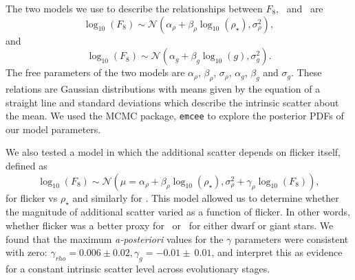 The two models we use to describe the relationships between $F_8$, \logg\ and
\rhostar\ are
\begin{equation}
	\log_{10}(F_8) \sim \mathcal{N} \left(\alpha_\rho +
    \beta_\rho \log_{10}(\rho_\star), \sigma_\rho^2 \right),
\end{equation}
\label{eq:rho}
and
\begin{equation}
	\log_{10}(F_8) \sim \mathcal{N} \left(\alpha_g + \beta_g
    \log_{10}(g), \sigma_g^2 \right).
\end{equation}
\label{eq:logg}
The free parameters of the two models are $\alpha_\rho$, $\beta_\rho$,
$\sigma_\rho$, $\alpha_g$, $\beta_g$ and $\sigma_g$.
These relations are Gaussian distributions with means given by the equation of
a straight line and standard deviations which describe the intrinsic scatter
about the mean.
We used the MCMC package, {\tt emcee} \citep{Foreman-Mackey2013} to explore the
posterior PDFs of our model parameters.

We also tested a model in which the additional scatter depends on flicker
itself, defined as
\begin{equation}
	\log_{10}(F_8) \sim \mathcal{N} \left(\mu = \alpha_\rho +
    \beta_\rho \log_{10}(\rho_\star), \sigma_{\rho}^2 + \gamma_\rho
    \log_{10}(F_8)
    \right),
\end{equation}
\label{eq:rho2}
for flicker vs $\rho_\star$ and similarly for \logg.
This model allowed us to determine whether the magnitude of additional scatter
varied as a function of flicker.
In other words, whether flicker was a better proxy for \logg\ or \rhostar\ for
either dwarf or giant stars.
We found that the maximum {\it a-posteriori} values for the $\gamma$
parameters were consistent with zero: $\gamma_{rho} = 0.006 \pm 0.02, \gamma_g
= -0.01 \pm\ 0.01$, and interpret this as evidence for a constant intrinsic
scatter level across evolutionary stages.

